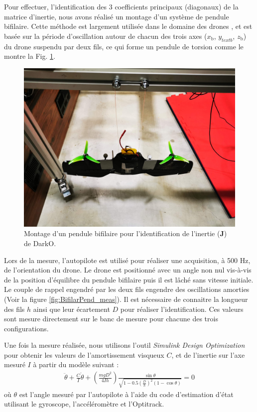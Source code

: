     {\color{blue}
    Pour effectuer, l'identification des 3 coefficients principaux (diagonaux) de la matrice d'inertie, nous avons réalisé un montage d'un système de pendule bifilaire. Cette méthode est largement utilisée dans le domaine des drones \cite{Jardin2007OptimizedMO}, et est basée sur la période d'oscillation autour de chacun des trois axes ($x_{{\text{b}}}$, $y_{text{b}}$, $z_{\text{b}}$) du drone suspendu par deux fils, ce qui forme un pendule de torsion comme le montre la Fig. \ref{fig:BifilarPend}.

    \begin{figure}[ht!]
        \centerline{
        \includegraphics[trim=20cm 15cm 23cm 0cm,clip,width=0.4\columnwidth]{figures/IMG_20230609_085023.jpg}}
        \caption{Montage d'un pendule bifilaire pour l'identification de l'inertie ($\boldsymbol{J}$) de DarkO.}
        \label{fig:BifilarPend}
    \end{figure}

    Lors de la mesure, l'autopilote est utilisé pour réaliser une acquisition, à 500 Hz, de l'orientation du drone. Le drone est positionné avec un angle non nul vis-à-vis de la position d'équilibre du pendule bifilaire puis il est lâché sans vitesse initiale. Le couple de rappel engendré par les deux fils engendre des oscillations amorties (Voir la figure \ref{fig:BifilarPend_meas}). Il est nécessaire de connaitre la longueur des fils $h$ ainsi que leur écartement $D$ pour réaliser l'identification. Ces valeurs sont mesure directement sur le banc de mesure pour chacune des trois configurations.

    Une fois la mesure réalisée, nous utilisons l'outil \textit{Simulink Design Optimization} pour obtenir les valeurs de l'amortissement visqueux $C$, et de l'inertie sur l'axe mesuré $I$ à partir du modèle suivant :
    \begin{align*}
        \ddot{\theta} +  \frac{C}{I}\dot{\theta} + \left(\frac{mgD^2}{4Ih}\right)\frac{\sin\theta}{\sqrt{1 - 0.5\left(\frac{D}{h}\right)^2(1 - \cos\theta)}} = 0
    \end{align*}
    où $\theta$ est l'angle mesuré par l'autopilote à l'aide du code d'estimation d'état utilisant le gyroscope, l'accéléromètre et l'Optitrack.
    

}
